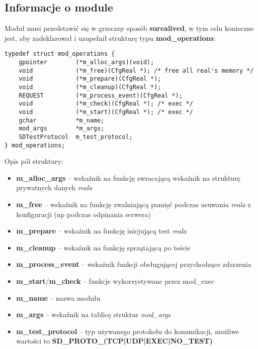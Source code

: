 \documentclass[polish,12pt]{article}
\begin{document}
\subsection{Informacje o module}
Moduł musi przedstawić się w grzeczny sposób \textbf{surealived}, w tym celu konieczne
jest, aby zadeklarował i uzupełnił strukturę typu \textbf{mod\_operations}:
{\small
\begin{verbatim}
typedef struct mod_operations {
    gpointer        (*m_alloc_args)(void);
    void            (*m_free)(CfgReal *); /* free all real's memory */
    void            (*m_prepare)(CfgReal *);
    void            (*m_cleanup)(CfgReal *);
    REQUEST         (*m_process_event)(CfgReal *);
    void            (*m_check)(CfgReal *); /* exec */
    void            (*m_start)(CfgReal *); /* exec */
    gchar           *m_name;
    mod_args        *m_args;
    SDTestProtocol  m_test_protocol;
} mod_operations;
\end{verbatim}
}
Opis pól struktury:
\begin{itemize}
  \item \textbf{m\_alloc\_args} -- wskaźnik na funkcję zwracającą wskaźnik na strukturę
    prywatnych danych \textit{reala}
  \item \textbf{m\_free} -- wskaźnik na funkcję zwalniającą pamięć podczas usuwania \textit{reala}
    z konfiguracji (np podczas odpinania serwera)
  \item \textbf{m\_prepare} -- wskaźnik na funkcję inicjującą test \textit{reala}
  \item \textbf{m\_cleanup} -- wskaźnik na funkcję sprzątającą po teście
  \item \textbf{m\_process\_event} -- wskaźnik funkcji obsługującej przychodzące zdarzenia
  \item \textbf{m\_start}/\textbf{m\_check} -- funkcje wykorzystywane przez mod\_exec
  \item \textbf{m\_name} -- nazwa modułu
  \item \textbf{m\_args} -- wskaźnik na tablicę struktur \textit{mod\_args}
  \item \textbf{m\_test\_protocol} -- typ używanego protokołu do komunikacji,
    \newline
    możliwe wartości to \textbf{SD\_PROTO\_(TCP|UDP|EXEC|NO\_TEST)}

\end{itemize}
\newpage
\end{document}
